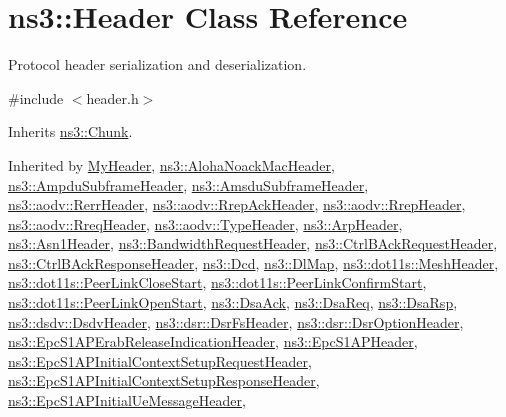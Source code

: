 \hypertarget{classns3_1_1Header}{}\section{ns3\+:\+:Header Class Reference}
\label{classns3_1_1Header}


Protocol header serialization and deserialization.  




{\ttfamily \#include $<$header.\+h$>$}



Inherits \hyperlink{classns3_1_1Chunk}{ns3\+::\+Chunk}.



Inherited by \hyperlink{classMyHeader}{My\+Header}, \hyperlink{classns3_1_1AlohaNoackMacHeader}{ns3\+::\+Aloha\+Noack\+Mac\+Header}, \hyperlink{classns3_1_1AmpduSubframeHeader}{ns3\+::\+Ampdu\+Subframe\+Header}, \hyperlink{classns3_1_1AmsduSubframeHeader}{ns3\+::\+Amsdu\+Subframe\+Header}, \hyperlink{classns3_1_1aodv_1_1RerrHeader}{ns3\+::aodv\+::\+Rerr\+Header}, \hyperlink{classns3_1_1aodv_1_1RrepAckHeader}{ns3\+::aodv\+::\+Rrep\+Ack\+Header}, \hyperlink{classns3_1_1aodv_1_1RrepHeader}{ns3\+::aodv\+::\+Rrep\+Header}, \hyperlink{classns3_1_1aodv_1_1RreqHeader}{ns3\+::aodv\+::\+Rreq\+Header}, \hyperlink{classns3_1_1aodv_1_1TypeHeader}{ns3\+::aodv\+::\+Type\+Header}, \hyperlink{classns3_1_1ArpHeader}{ns3\+::\+Arp\+Header}, \hyperlink{classns3_1_1Asn1Header}{ns3\+::\+Asn1\+Header}, \hyperlink{classns3_1_1BandwidthRequestHeader}{ns3\+::\+Bandwidth\+Request\+Header}, \hyperlink{classns3_1_1CtrlBAckRequestHeader}{ns3\+::\+Ctrl\+B\+Ack\+Request\+Header}, \hyperlink{classns3_1_1CtrlBAckResponseHeader}{ns3\+::\+Ctrl\+B\+Ack\+Response\+Header}, \hyperlink{classns3_1_1Dcd}{ns3\+::\+Dcd}, \hyperlink{classns3_1_1DlMap}{ns3\+::\+Dl\+Map}, \hyperlink{classns3_1_1dot11s_1_1MeshHeader}{ns3\+::dot11s\+::\+Mesh\+Header}, \hyperlink{classns3_1_1dot11s_1_1PeerLinkCloseStart}{ns3\+::dot11s\+::\+Peer\+Link\+Close\+Start}, \hyperlink{classns3_1_1dot11s_1_1PeerLinkConfirmStart}{ns3\+::dot11s\+::\+Peer\+Link\+Confirm\+Start}, \hyperlink{classns3_1_1dot11s_1_1PeerLinkOpenStart}{ns3\+::dot11s\+::\+Peer\+Link\+Open\+Start}, \hyperlink{classns3_1_1DsaAck}{ns3\+::\+Dsa\+Ack}, \hyperlink{classns3_1_1DsaReq}{ns3\+::\+Dsa\+Req}, \hyperlink{classns3_1_1DsaRsp}{ns3\+::\+Dsa\+Rsp}, \hyperlink{classns3_1_1dsdv_1_1DsdvHeader}{ns3\+::dsdv\+::\+Dsdv\+Header}, \hyperlink{classns3_1_1dsr_1_1DsrFsHeader}{ns3\+::dsr\+::\+Dsr\+Fs\+Header}, \hyperlink{classns3_1_1dsr_1_1DsrOptionHeader}{ns3\+::dsr\+::\+Dsr\+Option\+Header}, \hyperlink{classns3_1_1EpcS1APErabReleaseIndicationHeader}{ns3\+::\+Epc\+S1\+A\+P\+Erab\+Release\+Indication\+Header}, \hyperlink{classns3_1_1EpcS1APHeader}{ns3\+::\+Epc\+S1\+A\+P\+Header}, \hyperlink{classns3_1_1EpcS1APInitialContextSetupRequestHeader}{ns3\+::\+Epc\+S1\+A\+P\+Initial\+Context\+Setup\+Request\+Header}, \hyperlink{classns3_1_1EpcS1APInitialContextSetupResponseHeader}{ns3\+::\+Epc\+S1\+A\+P\+Initial\+Context\+Setup\+Response\+Header}, \hyperlink{classns3_1_1EpcS1APInitialUeMessageHeader}{ns3\+::\+Epc\+S1\+A\+P\+Initial\+Ue\+Message\+Header}, 